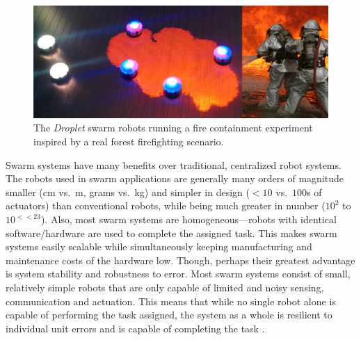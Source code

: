 \documentclass[defaultstyle,12pt]{thesis}
\begin{document}
\begin{figure}[!tb]
	\centering\includegraphics[width=\textwidth]{../assets/dropletfire.png}
	\centering\caption{The \emph{Droplet} swarm robots running a fire containment experiment inspired by a real forest firefighting scenario.}\label{fig:dropletfire}
\end{figure}

Swarm systems have many benefits over traditional, centralized robot systems. The robots used in swarm applications are generally many orders of magnitude smaller (cm vs.~m, grams vs.~kg) and simpler in design ($<10$ vs.~$100$s of actuators) than conventional robots, while being much greater in number ($10^2$ to $10^{<<23}$). Also, most swarm systems are homogeneous---robots with identical software/hardware are used to complete the assigned task. This makes swarm systems easily scalable while simultaneously keeping manufacturing and maintenance costs of the hardware low. Though, perhaps their greatest advantage is system stability and robustness to error. Most swarm systems consist of small, relatively simple robots that are only capable of limited and noisy sensing, communication and actuation. This means that while no single robot alone is capable of performing the task assigned, the system as a whole is resilient to individual unit errors and is capable of completing the task \cite{Winfield2005}.
\end{document}
